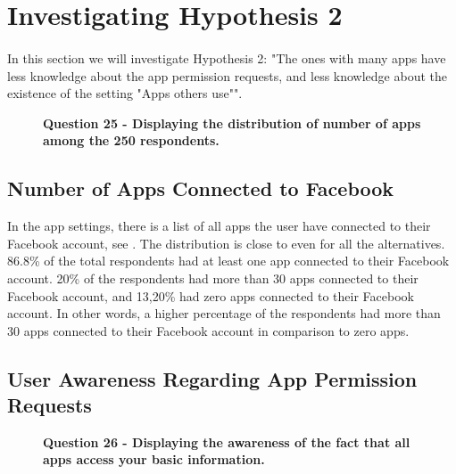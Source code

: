 \section{Investigating Hypothesis 2}

\paragraph{}
In this section we will investigate Hypothesis 2: "The ones with many apps have less knowledge about the app permission requests, and less knowledge about the existence of the setting "Apps others use"". 

\begin{figure}[h!]
\centering
{}
\caption[Question 25 - Displaying the distribution of number of apps among the 250 respondents]{\textbf{Question 25 - Displaying the distribution of number of apps among the 250 respondents.}} 
\label{fig:appsyouuse}
\end{figure}

\subsection{Number of Apps Connected to Facebook}
In the app settings, there is a list of all apps the user have connected to their Facebook account, see . The distribution is close to even for all the alternatives. 86.8\% of the total respondents had at least one app connected to their Facebook account. 20\% of the respondents had more than 30 apps connected to their Facebook account, and 13,20\% had zero apps connected to their Facebook account. In other words, a higher percentage of the respondents had more than 30 apps connected to their Facebook account in comparison to zero apps. 

\subsection{User Awareness Regarding App Permission Requests}
\begin{figure}[h!]
\centering
{}
\caption[Question 26 - Displaying the awareness of the fact that all apps access your basic information]{\textbf{Question 26 - Displaying the awareness of the fact that all apps access your basic information.}} 
\label{fig:appsaccessbasicinfo}
\end{figure}

